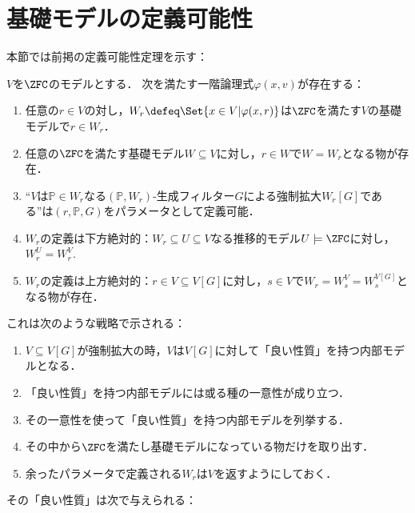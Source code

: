 \documentclass[a4j,leqno]{ltjsarticle}
\theoremstyle{nonumberplain}
\begin{document}
\section{基礎モデルの定義可能性}
本節では前掲の定義可能性定理を示す：
\begin{theorem}[基礎モデルの一様定義可能性]
 $V$を$\ZFC$のモデルとする．
 次を満たす一階論理式$\varphi(x, v)$が存在する：
 \begin{enumerate}
  \item\label{item:Wr-defines-ground} 任意の$r \in V$の対し，$W_r \defeq \Set{x \in V | \varphi(x, r)}$は$\ZFC$を満たす$V$の基礎モデルで$r \in W_r$．
  \item\label{item:W-enum-grounds} 任意の$\ZFC$を満たす基礎モデル$W \subseteq V$に対し，$r \in W$で$W = W_r$となる物が存在．
  \item\label{item:V-is-W[G]-defble} ``$V$は$\mathbb{P} \in W_r$なる$(\mathbb{P}, W_r)$-生成フィルター$G$による強制拡大$W_r[G]$である''は$(r, \mathbb{P}, G)$をパラメータとして定義可能．
  \item\label{item:Wr-dwnwd-abs} $W_r$の定義は下方絶対的：$W_r \subseteq U \subseteq V$なる推移的モデル$U \models \ZFC$に対し，$W_r^U = W_r^V$.
  \item\label{item:Wr-upwd-abs} $W_r$の定義は上方絶対的：$r \in V \subseteq V[G]$に対し，$s \in V$で$W_r = W_s^V = W_s^{V[G]}$となる物が存在．
 \end{enumerate}
\end{theorem}
これは次のような戦略で示される：
\begin{enumerate}
 \item $V \subseteq V[G]$が強制拡大の時，$V$は$V[G]$に対して「良い性質」を持つ内部モデルとなる．
 \item 「良い性質」を持つ内部モデルには或る種の一意性が成り立つ．
 \item その一意性を使って「良い性質」を持つ内部モデルを列挙する．
 \item その中から$\ZFC$を満たし基礎モデルになっている物だけを取り出す．
 \item 余ったパラメータで定義される$W_r$は$V$を返すようにしておく．
\end{enumerate}
その「良い性質」は次で与えられる：
\end{document}
